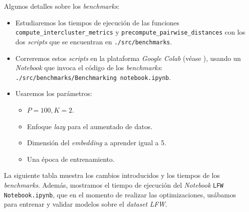 Algunos detalles sobre los \textit{benchmarks}:

\begin{itemize}
	\item Estudiaremos los tiempos de ejecución de las funciones \lstinline{compute_intercluster_metrics} y \lstinline{precompute_pairwise_distances} con los dos \textit{scripts} que se encuentran en \lstinline{./src/benchmarks}.
	\item Correremos estos \textit{scripts} en la plataforma \textit{Google Colab} (véase ), usando un \textit{Notebook} que invoca el código de los \textit{benchmarks}: \lstinline{./src/benchmarks/Benchmarking notebook.ipynb}.
	\item Usaremos los parámetros:
	      \begin{itemize}
		      \item $P = 100, K = 2$.
		      \item Enfoque \textit{lazy} para el aumentado de datos.
		      \item Dimensión del \textit{embedding} a aprender igual a 5.
		      \item Una época de entrenamiento.
	      \end{itemize}
\end{itemize}

La siguiente tabla muestra los cambios introducidos y los tiempos de los \textit{benchmarks}. Además, mostramos el tiempo de ejecución del \textit{Notebook} \lstinline{LFW Notebook.ipynb}, que en el momento de realizar las optimizaciones, usábamos para entrenar y validar modelos sobre el \textit{dataset} \textit{LFW}.

